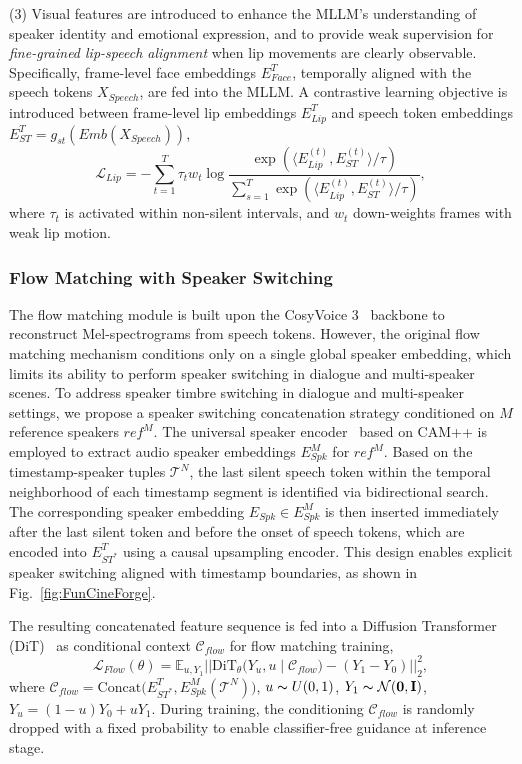 \documentclass{article}
\begin{document}
(3) Visual features are introduced to enhance the MLLM's understanding of speaker identity and emotional expression,
and to provide weak supervision for \emph{fine-grained lip-speech alignment} when lip movements are clearly observable.
Specifically, frame-level face embeddings $E_{Face}^T$, temporally aligned with the speech tokens $X_{Speech}$, are fed into the MLLM.
A contrastive learning objective is introduced between frame-level lip embeddings $E_{Lip}^T$ and 
speech token embeddings $E_{ST}^T=g_{st}(Emb(X_{Speech}))$,
\begin{equation}
    \mathcal{L}_{Lip}=-\sum_{t=1}^T\tau_tw_t\log\frac{
            \exp\left(\langle E_{Lip}^{(t)},E_{ST}^{(t)} \rangle / \tau\right)
        }{
            \sum_{s=1}^{T}\exp\left(\langle E_{Lip}^{(t)},E_{ST}^{(t)}\rangle / \tau\right)
        },
\end{equation}
where $\tau_t$ is activated within non-silent intervals,
and $w_t$ down-weights frames with weak lip motion.

\subsubsection{Flow Matching with Speaker Switching}
The flow matching module is built upon the CosyVoice 3~\cite{CosyVoice3} backbone to reconstruct Mel-spectrograms from speech tokens.
However, the original flow matching mechanism conditions only on a single global speaker embedding, 
which limits its ability to perform speaker switching in dialogue and multi-speaker scenes.
To address speaker timbre switching in dialogue and multi-speaker settings, 
we propose a speaker switching concatenation strategy conditioned on $M$ reference speakers $ref^{M}$.
The universal speaker encoder~\cite{3D-Speaker} based on CAM++ is employed to extract audio speaker embeddings $E_{Spk}^M$ for $ref^{M}$.
Based on the timestamp-speaker tuples $\mathcal{T}^N$, the last silent speech token within the temporal neighborhood of each timestamp segment is identified via bidirectional search.
The corresponding speaker embedding $E_{Spk}\in E_{Spk}^M$ is then inserted immediately after the last silent token and before the onset of speech tokens, 
which are encoded into $E_{ST^*}^T$ using a causal upsampling encoder.
This design enables explicit speaker switching aligned with timestamp boundaries, as shown in Fig.~\ref{fig:FunCineForge}.

The resulting concatenated feature sequence is fed into a Diffusion Transformer (DiT)~\cite{DiT} as conditional context $\mathcal{C}_{flow}$ for flow matching training,
\begin{equation}
	\mathcal{L}_{Flow}(\theta) = \mathbb{E}_{u,Y_1}||\mathrm{DiT}_\theta \bigl(Y_u,u \mid \mathcal{C}_{flow}\bigr) - (Y_1-Y_0)||_2^2,
\end{equation}
where $\mathcal{C}_{flow}=\mathrm{Concat}\bigl(E_{ST^*}^T, E_{Spk}^M(\mathcal{T}^N)\bigr)$, $u\thicksim U(0,1)$, 
$Y_1\thicksim \mathcal{N}(\mathbf{0},\mathbf{I})$, 
$Y_u = (1-u)Y_0 + uY_1$.
During training, the conditioning $\mathcal{C}_{flow}$ is randomly dropped with a fixed probability to enable classifier-free guidance at inference stage.
\end{document}

